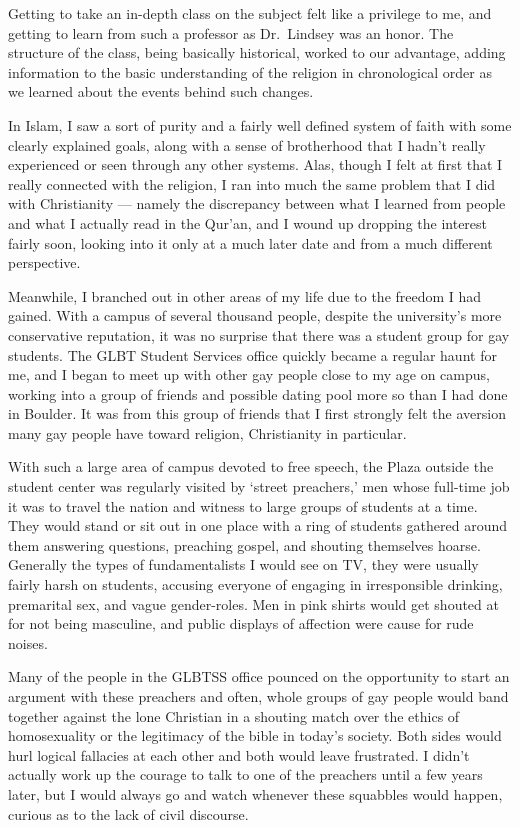 Getting to take an in-depth class on the subject felt like a privilege to me, and getting to learn from such a professor as Dr.~Lindsey was an honor. The structure of the class, being basically historical, worked to our advantage, adding information to the basic understanding of the religion in chronological order as we learned about the events behind such changes.

In Islam, I saw a sort of purity and a fairly well defined system of faith with some clearly explained goals, along with a sense of brotherhood that I hadn't really experienced or seen through any other systems. Alas, though I felt at first that I really connected with the religion, I ran into much the same problem that I did with Christianity --- namely the discrepancy between what I learned from people and what I actually read in the Qur'an, and I wound up dropping the interest fairly soon, looking into it only at a much later date and from a much different perspective.

Meanwhile, I branched out in other areas of my life due to the freedom I had gained. With a campus of several thousand people, despite the university's more conservative reputation, it was no surprise that there was a student group for gay students. The GLBT Student Services office quickly became a regular haunt for me, and I began to meet up with other gay people close to my age on campus, working into a group of friends and possible dating pool more so than I had done in Boulder. It was from this group of friends that I first strongly felt the aversion many gay people have toward religion, Christianity in particular.

With such a large area of campus devoted to free speech, the Plaza outside the student center was regularly visited by `street preachers,' men whose full-time job it was to travel the nation and witness to large groups of students at a time. They would stand or sit out in one place with a ring of students gathered around them answering questions, preaching gospel, and shouting themselves hoarse. Generally the types of fundamentalists I would see on TV, they were usually fairly harsh on students, accusing everyone of engaging in irresponsible drinking, premarital sex, and vague gender-roles. Men in pink shirts would get shouted at for not being masculine, and public displays of affection were cause for rude noises.

Many of the people in the GLBTSS office pounced on the opportunity to start an argument with these preachers and often, whole groups of gay people would band together against the lone Christian in a shouting match over the ethics of homosexuality or the legitimacy of the bible in today's society. Both sides would hurl logical fallacies at each other and both would leave frustrated. I didn't actually work up the courage to talk to one of the preachers until a few years later, but I would always go and watch whenever these squabbles would happen, curious as to the lack of civil discourse.

